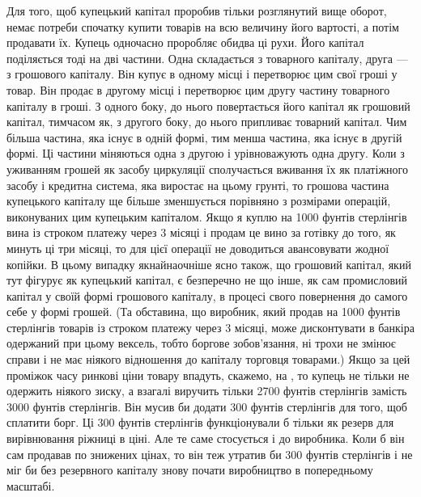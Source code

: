 Для того, щоб купецький капітал проробив тільки розглянутий
вище оборот, немає потреби спочатку купити товарів на
всю величину його вартості, а потім продавати їх. Купець одночасно
проробляє обидва ці рухи. Його капітал поділяється тоді
на дві частини. Одна складається з товарного капіталу, друга —
з грошового капіталу. Він купує в одному місці і перетворює
цим свої гроші у товар. Він продає в другому місці і перетворює
цим другу частину товарного капіталу в гроші. З одного
боку, до нього повертається його капітал як грошовий капітал,
тимчасом як, з другого боку, до нього припливає товарний капітал.
Чим більша частина, яка існує в одній формі, тим менша
частина, яка існує в другій формі. Ці частини міняються одна
з другою і урівноважують одна другу. Коли з уживанням грошей
як засобу циркуляції сполучається вживання їх як платіжного
засобу і кредитна система, яка виростає на цьому грунті, то
грошова частина купецького капіталу ще більше зменшується порівняно
з розмірами операцій, виконуваних цим купецьким капіталом.
Якщо я куплю на 1000 фунтів стерлінгів вина із строком
платежу через 3 місяці і продам це вино за готівку до того, як
минуть ці три місяці, то для цієї операції не доводиться авансовувати
жодної копійки. В цьому випадку якнайнаочніше ясно
також, що грошовий капітал, який тут фігурує як купецький
капітал, є безперечно не що інше, як сам промисловий капітал
у своїй формі грошового капіталу, в процесі свого повернення
до самого себе у формі грошей. (Та обставина, що виробник,
який продав на 1000 фунтів стерлінгів товарів із строком платежу
через 3 місяці, може дисконтувати в банкіра одержаний при цьому
вексель, тобто боргове зобов’язання, ні трохи не змінює справи
і не має ніякого відношення до капіталу торговця товарами.)
Якщо за цей проміжок часу ринкові ціни товару впадуть,
скажемо, на , то купець не тільки не одержить ніякого
зиску, а взагалі виручить тільки 2700 фунтів стерлінгів замість
3000 фунтів стерлінгів. Він мусив би додати 300 фунтів стерлінгів
для того, щоб сплатити борг. Ці 300 фунтів стерлінгів
функціонували б тільки як резерв для вирівнювання ріжниці в
ціні. Але те саме стосується і до виробника. Коли б він сам продавав
по знижених цінах, то він теж утратив би 300 фунтів стерлінгів
і не міг би без резервного капіталу знову почати виробництво
в попередньому масштабі.

